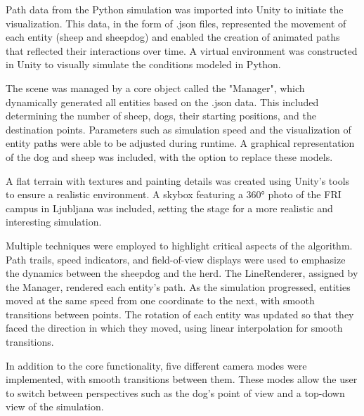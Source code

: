 \documentclass[9pt]{pnas-new}
\begin{document}
Path data from the Python simulation was imported into Unity to initiate the visualization. This data, in the form of .json files, represented the movement of each entity (sheep and sheepdog) and enabled the creation of animated paths that reflected their interactions over time. A virtual environment was constructed in Unity to visually simulate the conditions modeled in Python.

The scene was managed by a core object called the "Manager", which dynamically generated all entities based on the .json data. This included determining the number of sheep, dogs, their starting positions, and the destination points. Parameters such as simulation speed and the visualization of entity paths were able to be adjusted during runtime. A graphical representation of the dog and sheep was included, with the option to replace these models.

A flat terrain with textures and painting details was created using Unity’s tools to ensure a realistic environment. A skybox featuring a 360° photo of the FRI campus in Ljubljana was included, setting the stage for a more realistic and interesting simulation.

Multiple techniques were employed to highlight critical aspects of the algorithm. Path trails, speed indicators, and field-of-view displays were used to emphasize the dynamics between the sheepdog and the herd. The LineRenderer, assigned by the Manager, rendered each entity’s path. As the simulation progressed, entities moved at the same speed from one coordinate to the next, with smooth transitions between points. The rotation of each entity was updated so that they faced the direction in which they moved, using linear interpolation for smooth transitions.

In addition to the core functionality, five different camera modes were implemented, with smooth transitions between them. These modes allow the user to switch between perspectives such as the dog’s point of view and a top-down view of the simulation.
\end{document}
